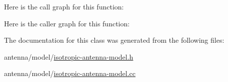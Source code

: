 Here is the call graph for this function\+:




Here is the caller graph for this function\+:




The documentation for this class was generated from the following files\+:\begin{DoxyCompactItemize}
\item 
antenna/model/\hyperlink{isotropic-antenna-model_8h}{isotropic-\/antenna-\/model.\+h}\item 
antenna/model/\hyperlink{isotropic-antenna-model_8cc}{isotropic-\/antenna-\/model.\+cc}\end{DoxyCompactItemize}
